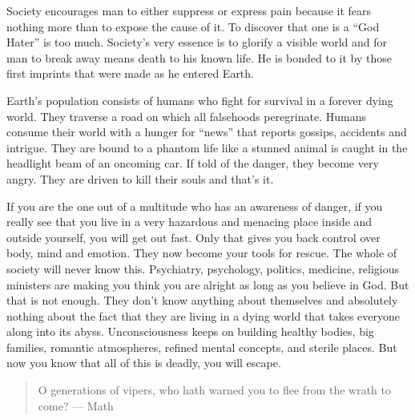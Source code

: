\documentclass[landscape,twocolumn,letterpaper]{article}
\begin{document}
Society encourages man to either suppress or express pain because it
fears nothing more than to expose the cause of it. To discover that
one is a ``God Hater'' is too much. Society's very essence is to
glorify a visible world and for man to break away means death to his
known life. He is bonded to it by those first imprints that were made
as he entered Earth.

Earth's population consists of humans who fight for survival in a
forever dying world. They traverse a road on which all falsehoods
peregrinate. Humans consume their world with a hunger for ``news'' that
reports gossips, accidents and intrigue. They are bound to a phantom
life like a stunned animal is caught in the headlight beam of an
oncoming car. If told of the danger, they become very angry. They are
driven to kill their souls and that's it.

If you are the one out of a multitude who has an awareness of danger,
if you really see that you live in a very hazardous and menacing
place inside and outside yourself, you will get out fast. Only that
gives you back control over body, mind and emotion. They now become
your tools for rescue. The whole of society will never know
this. Psychiatry, psychology, politics, medicine, religious ministers
are making you think you are alright as long as you believe in
God. But that is not enough. They don't know anything about
themselves and absolutely nothing about the fact that they are living
in a dying world that takes everyone along into its
abyss. Unconsciousness keeps on building healthy bodies, big families,
romantic atmospheres, refined mental concepts, and sterile places. But
now you know that all of this is deadly, you will escape.

\begin{quotation} O generations of vipers, who hath warned you to flee
from the wrath to come?  --- Math
\end{quotation}
\end{document}
